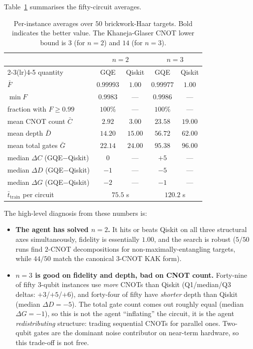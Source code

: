 \documentclass[11pt,a4paper]{article}
\begin{document}
Table~\ref{tab:headline} summarises the fifty-circuit averages.

\begin{table}[H]
\centering
\small
\begin{tabular}{lcccc}
\toprule
& \multicolumn{2}{c}{$n = 2$} & \multicolumn{2}{c}{$n = 3$}\\
\cmidrule(lr){2-3}\cmidrule(lr){4-5}
quantity                & GQE   & Qiskit & GQE   & Qiskit \\
\midrule
$\bar{F}$               & $0.99993$ & $1.00$ & $0.99977$ & $1.00$ \\
$\min F$                & $0.9983$  & ---    & $0.9986$  & ---    \\
fraction with $F \ge 0.99$ & $100\%$ & ---    & $100\%$ & --- \\
\midrule
mean CNOT count $\bar{C}$ & $\bm{2.92}$ & $3.00$ & $23.58$ & $\bm{19.00}$ \\
mean depth $\bar{D}$    & $\bm{14.20}$ & $15.00$ & $\bm{56.72}$ & $62.00$ \\
mean total gates $\bar{G}$ & $\bm{22.14}$ & $24.00$ & $\bm{95.38}$ & $96.00$ \\
\midrule
median $\Delta C$ (GQE$-$Qiskit) & $0$  & --- & $+5$ & ---\\
median $\Delta D$ (GQE$-$Qiskit) & $-1$ & --- & $-5$ & ---\\
median $\Delta G$ (GQE$-$Qiskit) & $-2$ & --- & $-1$ & ---\\
\midrule
$\bar{t}_{\text{train}}$ per circuit & \multicolumn{2}{c}{$75.5$ s} & \multicolumn{2}{c}{$120.2$ s}\\
\bottomrule
\end{tabular}
\caption{Per-instance averages over $50$ brickwork-Haar targets. Bold
indicates the better value. The Khaneja-Glaser CNOT lower bound is $3$
(for $n=2$) and $14$ (for $n=3$).}
\label{tab:headline}
\end{table}

The high-level diagnosis from these numbers is:

\begin{itemize}[leftmargin=2em]
\item \textbf{The agent has solved $n=2$.} It hits or beats Qiskit on
all three structural axes simultaneously, fidelity is essentially $1.00$,
and the search is robust ($5/50$ runs find $2$-CNOT decompositions for
non-maximally-entangling targets, while $44/50$ match the canonical
$3$-CNOT KAK form).

\item \textbf{$n = 3$ is good on fidelity and depth, bad on CNOT count.}
Forty-nine of fifty $3$-qubit instances use \emph{more} CNOTs than Qiskit
(Q1/median/Q3 deltas: $+3$/$+5$/$+6$), and forty-four of fifty have
\emph{shorter} depth than Qiskit (median $\Delta D = -5$). The total gate
count comes out roughly equal (median $\Delta G = -1$), so this is not
the agent ``inflating'' the circuit, it is the agent
\emph{redistributing} structure: trading sequential CNOTs for parallel
ones. Two-qubit gates are the dominant noise contributor on near-term
hardware, so this trade-off is not free.
\end{itemize}
\end{document}
